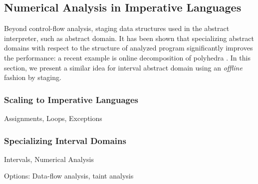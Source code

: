 \subsection{Numerical Analysis in Imperative Languages} \label{cases_imp}

Beyond control-flow analysis, staging data structures used in the abstract interpreter, such as abstract domain.
It has been shown that specializing abstract domains with respect to the structure of analyzed program significantly 
improves the performance: a recent example is online decomposition of polyhedra \cite{DBLP:conf/popl/SinghPV17, Singh:2017:PCD:3177123.3158143}.
In this section, we present a similar idea for interval abstract domain using an \textit{offline} fashion by staging.

\subsubsection{Scaling to Imperative Languages}

Assignments, Loops, Exceptions

\subsubsection{Specializing Interval Domains}

Intervals, Numerical Analysis

Options: Data-flow analysis, taint analysis
